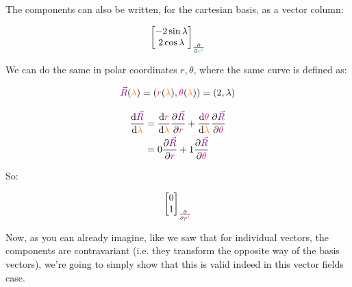 The components can also be written, for the cartesian basis, as a vector column:

\begin{equation}
    \begin{bmatrix}
        -2\sin\lambda\\
        2 \cos\lambda
    \end{bmatrix}_{\frac{\partial}{\partial \begingroup\color{cyan}c^i\endgroup}}
\end{equation}

We can do the same in polar coordinates $r, \theta$, where the same curve is defined as:

\begin{equation}
    \begingroup\color{violet}\vec{R}\endgroup (\begingroup\color{orange}\lambda\endgroup)= \left(\begingroup\color{magenta}r\endgroup(\begingroup\color{orange}\lambda\endgroup), \begingroup\color{magenta}\theta\endgroup(\begingroup\color{orange}\lambda\endgroup)\right) =
    \left(2 , \lambda\right)
\end{equation}

\begin{align*}
    \frac{\dd \begingroup\color{violet}\vec{R}\endgroup}{\dd \begingroup\color{orange}\lambda\endgroup} &= \frac{\dd \begingroup\color{magenta}r\endgroup}{\dd \begingroup\color{orange}\lambda\endgroup}
    \frac{\partial \begingroup\color{violet}\vec{R}\endgroup}{\partial \begingroup\color{magenta}r\endgroup} + 
    \frac{\dd \begingroup\color{magenta}\theta\endgroup}{\dd \begingroup\color{orange}\lambda\endgroup}
    \frac{\partial \begingroup\color{violet}\vec{R}\endgroup}{\partial \begingroup\color{magenta}\theta\endgroup}\\
    &= 0 \frac{\partial \begingroup\color{violet}\vec{R}\endgroup}{\partial \begingroup\color{magenta}r\endgroup} + 
    1 \frac{\partial \begingroup\color{violet}\vec{R}\endgroup}{\partial \begingroup\color{magenta}\theta\endgroup}
\end{align*}

So:

\begin{equation}
    \begin{bmatrix}
        0\\
        1
    \end{bmatrix}_{\frac{\partial}{\partial \begingroup\color{magenta}p^i\endgroup}}
\end{equation}

Now, as you can already imagine, like we saw that for individual vectors, the components are contravariant (i.e. they transform the opposite way of the basis vectors), 
we're going to simply show that this is valid indeed in this vector fields case.\\

